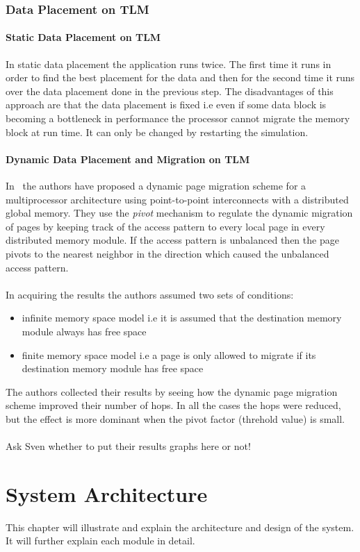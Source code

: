 \documentclass{listhesis}
\begin{document}
\subsection{Data Placement on TLM}
\subsubsection{Static Data Placement on TLM}
In static data placement the application runs twice. The first time it runs in order to find the best placement for the data and then for the second time it runs over the data placement done in the previous step. The disadvantages of this approach are that the data placement is fixed i.e even if some data block is becoming a bottleneck in performance the processor cannot migrate the memory block at run time. It can only be changed by restarting the simulation.
\subsubsection{Dynamic Data Placement and Migration on TLM}
In~\cite{dynamicPageMigration} the authors have proposed a dynamic page migration scheme for a multiprocessor architecture using point-to-point interconnects with a distributed global memory. They use the \textit{pivot} mechanism to regulate the dynamic migration of pages by keeping track of the access pattern to every local page in every distributed memory module. If the access pattern is unbalanced then the page pivots to the nearest neighbor in the direction which caused the unbalanced access pattern.\\
\\
In acquiring the results the authors assumed two sets of conditions:
\begin{itemize}
	\item infinite memory space model i.e it is assumed that the destination memory module always has free space
	\item finite memory space model i.e a page is only allowed to migrate if its destination memory module has free space
\end{itemize}
The authors collected their results by seeing how the dynamic page migration scheme improved their number of hops. In all the cases the hops were reduced, but the effect is more dominant when the pivot factor (threhold value) is small. \\
\\
Ask Sven whether to put their results graphs here or not!
\chapter{System Architecture}
This chapter will illustrate and explain the architecture and design of the system. It will further explain each module in detail.
\end{document}
